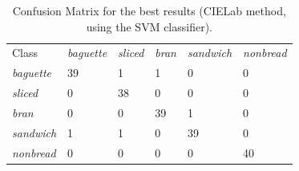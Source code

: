 \documentclass[twocolumn]{bmcart}%
\begin{document}
\begin{backmatter}
\begin{table}[h!]
\caption{Confusion Matrix for the best results (CIELab method, using the SVM classifier).}
\label{tab:confusionmatrix}       %
\begin{tabular}{llllll}
\hline\noalign{\smallskip}
Class&{\em baguette} & {\em sliced} & {\em bran} &{\em sandwich}&{\em nonbread} \\
\noalign{\smallskip}\hline\noalign{\smallskip}
{\em baguette} & 39& 1 &1 &0 &0 \\
{\em sliced} & 0& 38 &0 &0 &0  \\
{\em bran} & 0& 0 &39 &1 &0  \\
{\em sandwich} & 1& 1 &0 &39 &0  \\
{\em nonbread} & 0& 0 &0 &0 &40  \\
\hline
\end{tabular}
\end{table}






\end{backmatter}
\end{document}
